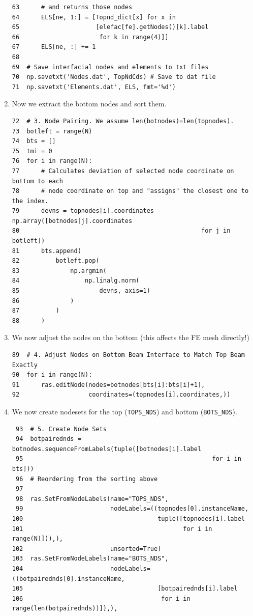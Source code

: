 \documentclass[11pt]{article}
\begin{document}
\begin{enumerate}
\begin{verbatim}
63      # and returns those nodes
64      ELS[ne, 1:] = [Topnd_dict[x] for x in
65                     [elefac[fe].getNodes()[k].label
66                      for k in range(4)]]
67      ELS[ne, :] += 1
68  
69  # Save interfacial nodes and elements to txt files
70  np.savetxt('Nodes.dat', TopNdCds) # Save to dat file
71  np.savetxt('Elements.dat', ELS, fmt='%d')
\end{verbatim}
\item Now we extract the bottom nodes and sort them.
\begin{verbatim}
72  # 3. Node Pairing. We assume len(botnodes)=len(topnodes).
73  botleft = range(N)
74  bts = []
75  tmi = 0
76  for i in range(N):
77      # Calculates deviation of selected node coordinate on bottom to each
78      # node coordinate on top and "assigns" the closest one to the index.
79      devns = topnodes[i].coordinates - np.array([botnodes[j].coordinates
80                                                  for j in botleft])
81      bts.append(
82          botleft.pop(
83              np.argmin(
84                  np.linalg.norm(
85                      devns, axis=1)
86              )
87          )
88      )
\end{verbatim}
\item We now adjust the nodes on the bottom (this affects the FE mesh directly!)
\begin{verbatim}
89  # 4. Adjust Nodes on Bottom Beam Interface to Match Top Beam Exactly
90  for i in range(N):
91      ras.editNode(nodes=botnodes[bts[i]:bts[i]+1],
92                   coordinates=(topnodes[i].coordinates,))
\end{verbatim}
\item We now create nodesets for the top (\texttt{TOPS\_NDS}) and bottom (\texttt{BOTS\_NDS}).
\begin{verbatim}
 93  # 5. Create Node Sets
 94  botpairednds = botnodes.sequenceFromLabels(tuple([botnodes[i].label
 95                                                    for i in bts]))
 96  # Reordering from the sorting above
 97  
 98  ras.SetFromNodeLabels(name="TOPS_NDS", 
 99                        nodeLabels=((topnodes[0].instanceName, 
100                                     tuple([topnodes[i].label
101                                            for i in range(N)])),),
102                        unsorted=True)
103  ras.SetFromNodeLabels(name="BOTS_NDS", 
104                        nodeLabels=((botpairednds[0].instanceName, 
105                                     [botpairednds[i].label
106                                      for i in range(len(botpairednds))]),),

\end{verbatim}
\end{enumerate}
\end{document}
